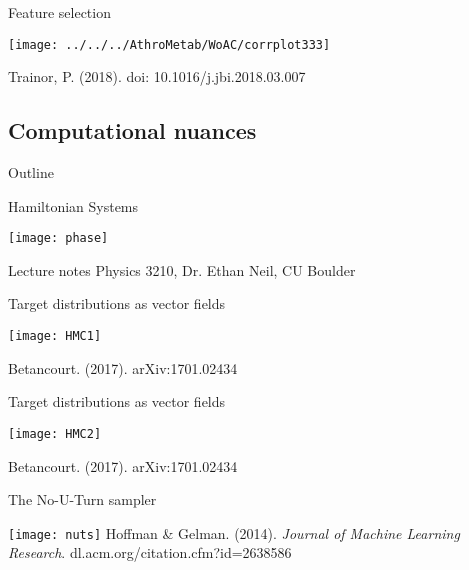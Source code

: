 \documentclass[xcolor=dvipsnames]{beamer}
\begin{document}
\begin{frame}{Feature selection}
	\vspace{-10pt}
	\begin{center}
		\texttt{[image: ../../../AthroMetab/WoAC/corrplot333]}
		
		Trainor, P. (2018). doi: 10.1016/j.jbi.2018.03.007 
	\end{center}
\end{frame}

\subsection{Computational nuances}
\begin{frame}{Outline}
	\vspace{-10.5pt}
	\tableofcontents[currentsection,subsectionstyle=show/shaded/hide]
\end{frame}

\begin{frame}{Hamiltonian Systems}
	\vspace{-5pt}
	\begin{center}
		\texttt{[image: phase]}
		
		Lecture notes Physics 3210, Dr. Ethan Neil, CU Boulder
	\end{center}
\end{frame}

\begin{frame}{Target distributions as vector fields}
	\vspace{-5pt}
	\begin{center}
		\texttt{[image: HMC1]}
		
	Betancourt. (2017). arXiv:1701.02434
	\end{center}
\end{frame}

\begin{frame}{Target distributions as vector fields}
	\vspace{-5pt}
	\begin{center}
		\texttt{[image: HMC2]}
		
		Betancourt. (2017). arXiv:1701.02434
	\end{center}
\end{frame}

\begin{frame}{The No-U-Turn sampler}
	\vspace{-10pt}
	\begin{center}
		\texttt{[image: nuts]}
		\vspace{2ex}
		Hoffman \& Gelman. (2014). \emph{Journal of Machine Learning Research}. dl.acm.org/citation.cfm?id=2638586
	\end{center}
\end{frame}
\end{document}
